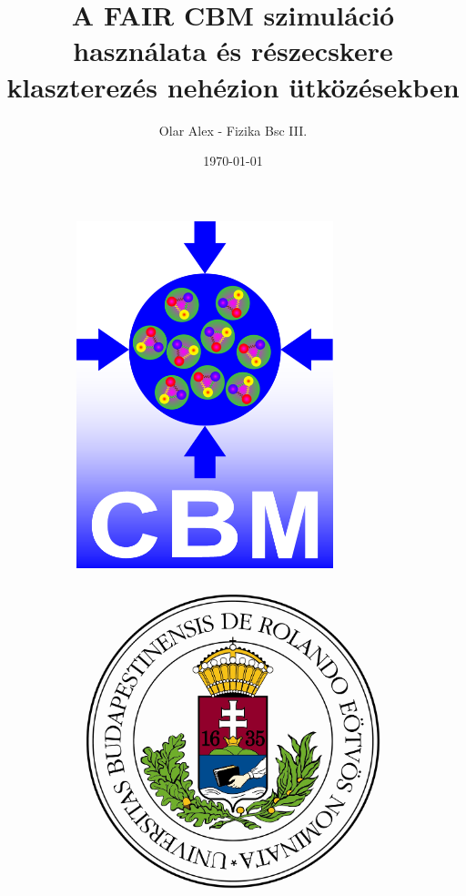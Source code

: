 \documentclass[a4paper,12pt]{article}
\author{Olar Alex - Fizika Bsc III.}
\title{A FAIR CBM szimuláció használata és részecskere klaszterezés nehézion ütközésekben}
\date{\today}
\begin{document}
\linespread{1.12358}
\clearpage\maketitle
\thispagestyle{empty}
\vfill
\begin{figure}[H]
	\centering
	\begin{subfigure}{.39\textwidth}
		\includegraphics[width=0.82\textwidth]{gsi.png}
	\end{subfigure}
	\begin{subfigure}{.39\textwidth}
		\includegraphics[width=.82\textwidth]{elte.jpg}
	\end{subfigure}
\end{figure}
\end{document}
